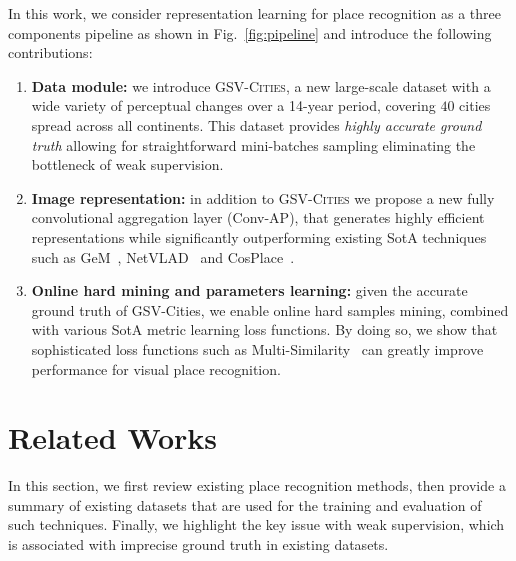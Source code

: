 \documentclass{article}
\begin{document}
In this work, we consider representation learning for place recognition as a three components pipeline as shown in Fig.~\ref{fig:pipeline} and introduce the following contributions:
\begin{enumerate}
    \item \textbf{Data module:} we introduce \textsc{GSV-Cities}, a new large-scale dataset with a wide variety of perceptual changes over a 14-year period, covering $40$ cities spread across all continents. This dataset provides \emph{highly accurate ground truth} allowing for straightforward mini-batches sampling eliminating the bottleneck of weak supervision.
    \item \textbf{Image representation:} in addition to \textsc{GSV-Cities} we propose a new fully convolutional aggregation layer (Conv-AP), that generates highly efficient representations while significantly outperforming existing SotA techniques such as GeM~\cite{radenovic2018fine}, NetVLAD~\cite{arandjelovic2016netvlad} and CosPlace~\cite{berton2022rethinking}.
    \item \textbf{Online hard mining and parameters learning:}  given the accurate ground truth of GSV-Cities, we enable online hard samples mining, combined with various SotA metric learning loss functions. By doing so, we show that sophisticated loss functions such as Multi-Similarity~\cite{wang2019multi} can greatly improve performance for visual place recognition.
\end{enumerate}


\section{Related Works}
In this section, we first review existing place recognition methods, then provide a summary of existing datasets that are used for the training and evaluation of such techniques. Finally, we highlight the key issue with weak supervision, which is associated with imprecise ground truth in existing datasets.
\end{document}
